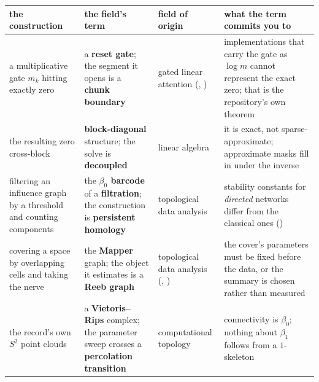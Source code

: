 \documentclass[11pt,a4paper]{article}
\newcounter{none}                 %
\theoremstyle{plain}
\theoremstyle{definition}
\theoremstyle{remark}
\begin{document}
{\def\LTcaptype{none} %
\begin{longtable}[]{@{}
  >{\raggedright\arraybackslash}p{}
  >{\raggedright\arraybackslash}p{}
  >{\raggedright\arraybackslash}p{}
  >{\raggedright\arraybackslash}p{}@{}}
\toprule\noalign{}
\begin{minipage}[b]{\linewidth}\raggedright
the construction
\end{minipage} & \begin{minipage}[b]{\linewidth}\raggedright
the field's term
\end{minipage} & \begin{minipage}[b]{\linewidth}\raggedright
field of origin
\end{minipage} & \begin{minipage}[b]{\linewidth}\raggedright
what the term commits you to
\end{minipage} \\
\midrule\noalign{}
\endhead
\bottomrule\noalign{}
\endlastfoot
a multiplicative gate \(m_k\) hitting exactly zero & a \textbf{reset
gate}; the segment it opens is a \textbf{chunk boundary} & gated linear
attention (\citep{yang-2023-gla},
\citep{lin-2025-forgetting-transformer}) & implementations that carry
the gate as \(\log m\) cannot represent the exact zero; that is the
repository's own theorem \\
the resulting zero cross-block & \textbf{block-diagonal} structure; the
solve is \textbf{decoupled} & linear algebra & it is exact, not
sparse-approximate; approximate masks fill in under the inverse \\
filtering an influence graph by a threshold and counting components &
the \textbf{\(\beta_0\) barcode} of a \textbf{filtration}; the
construction is \textbf{persistent homology} & topological data analysis
& stability constants for \emph{directed} networks differ from the
classical ones (\citep{turner-2019-quasimetric-rips}) \\
covering a space by overlapping cells and taking the nerve & the
\textbf{Mapper} graph; the object it estimates is a \textbf{Reeb graph}
& topological data analysis (\citep{singh-2007-mapper},
\citep{carriere-2018-mapper-statistics}) & the cover's parameters must
be fixed before the data, or the summary is chosen rather than
measured \\
the record's own \(S^2\) point clouds & a \textbf{Vietoris--Rips}
complex; the parameter sweep crosses a \textbf{percolation transition} &
computational topology & connectivity is \(\beta_0\); nothing about
\(\beta_1\) follows from a \(1\)-skeleton \\
\end{longtable}
}
\end{document}
